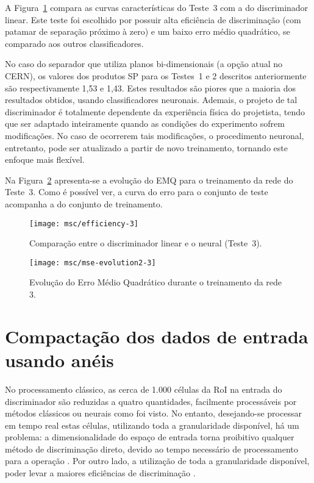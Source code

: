A Figura~\ref{fig:comp-linear} compara as curvas características do Teste~3
com a do discriminador linear. Este teste foi escolhido por possuir alta
eficiência de discriminação (com patamar de separação próximo à zero) e um
baixo erro médio quadrático, se comparado aos outros classificadores.

No caso do separador que utiliza planos bi-dimensionais (a op\-ção atual no
CERN), os valores dos produtos SP para os Testes~1 e 2 descritos anteriormente
são respectivamente 1,53 e 1,43. Estes resultados são piores que a maioria dos
resultados obtidos, usando classificadores neuronais. Ademais, o projeto de
tal discriminador é totalmente dependente da experiência física do projetista,
tendo que ser adaptado inteiramente quando as condições do experimento sofrem
modificações. No caso de ocorrerem tais modificações, o procedimento neuronal,
entretanto, pode ser atualizado a partir de novo treinamento, tornando este
enfoque mais flexível.

Na Figura~\ref{fig:emq} apresenta-se a evolução do EMQ para o treinamento da
rede do Teste~3. Como é possível ver, a curva do erro para o conjunto de teste
acompanha a do conjunto de treinamento.

\begin{figure}
\begin{center}
\texttt{[image: msc/efficiency-3]}
\end{center}
\caption{Comparação entre o discriminador linear e o neural (Teste~3).}
\label{fig:comp-linear}
\end{figure}

\begin{figure}
\begin{center}
\texttt{[image: msc/mse-evolution2-3]}
\end{center}
\caption{Evolução do Erro Médio Quadrático durante o treinamento da rede 3.}
\label{fig:emq}
\end{figure}

\section{Compactação dos dados de entrada usando a\-néis}
\label{sec:aneis}

No processamento clássico, as cerca de 1.000 células da RoI na entrada do
discriminador são reduzidas a quatro quantidades, facilmente processáveis por
métodos clássicos ou neurais como foi visto. No entanto, desejando-se
processar em tempo real estas células, utilizando toda a granularidade
disponível, há um problema: a dimensionalidade do espaço de entrada torna
proibitivo qualquer método de discriminação direto, devido ao tempo necessário
de processamento para a operação . Por outro lado, a utilização
de toda a granularidade disponível, poder levar a maiores eficiências de
discriminação \cite{seixas:fe, andre-enfpc2000, andre-enfpc98}.

